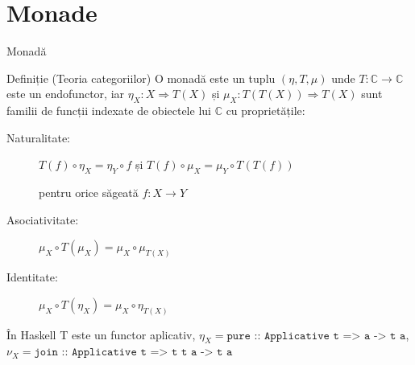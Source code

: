 \documentclass[xcolor=pdftex,romanian,colorlinks]{beamer}
\begin{document}
\section{Monade}
\begin{frame}{Monadă}
\begin{block}
{Definiție (Teoria categoriilor)}
O monadă este un tuplu $(\eta, T, \mu)$ unde $T : \mathbb{C} \rightarrow \mathbb{C}$ este un endofunctor, iar $\eta_X : X \Rightarrow T(X)$ și $\mu_X : T(T(X)) \Rightarrow T(X)$ sunt familii de funcții indexate de obiectele lui $\mathbb{C}$ cu proprietățile:
\begin{description}
\item[Naturalitate:] $T(f) \circ \eta_X = \eta_Y \circ f$
și $T(f)\circ \mu_X = \mu_Y \circ T(T(f))$

pentru orice săgeată $f : X \rightarrow Y$

\item[Asociativitate:] $\mu_X \circ T(\mu_X) = \mu_X \circ \mu_{T(X)}$

\item[Identitate:] $ \mu_X \circ T(\eta_X) = \mu_X\circ \eta_{T(X)}$

\end{description}
\end{block}

\begin{block}{În Haskell T este un functor aplicativ, $\eta_X = \texttt{pure :: Applicative t => a -> t a}$, $\nu_X = \texttt{join :: Applicative t => t t a -> t a} $}
\end{block}
\end{frame}
\end{document}
